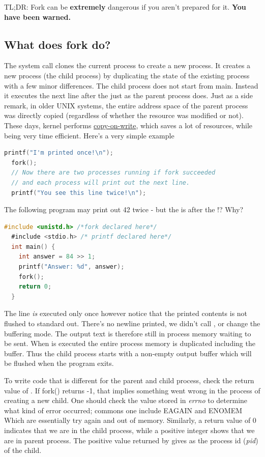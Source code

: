 TL;DR: Fork can be \textbf{extremely} dangerous if you aren't prepared for it. \textbf{You have been warned.}

\subsection{What does fork do?}

The  system call clones the current process to create a new process.
It creates a new process (the child process) by duplicating the state of the existing process with a few minor differences.
The child process does not start from main.
Instead it executes the next line after the  just as the parent process does.
Just as a side remark, in older UNIX systems, the entire address space of the parent process was directly copied (regardless of whether the resource was modified or not).
These days, kernel performs \href{https://en.wikipedia.org/wiki/Copy-on-write}{copy-on-write}, which saves a lot of resources, while being very time efficient.
Here's a very simple example

\begin{lstlisting}[language=C]
  printf("I'm printed once!\n");
  fork();
  // Now there are two processes running if fork succeeded
  // and each process will print out the next line.
  printf("You see this line twice!\n");
\end{lstlisting}

The following program may print out 42 twice - but the  is after the !? Why?

\begin{lstlisting}[language=C]
  #include <unistd.h> /*fork declared here*/
  #include <stdio.h> /* printf declared here*/
  int main() {
    int answer = 84 >> 1;
    printf("Answer: %d", answer);
    fork();
    return 0;
  }
\end{lstlisting}

The  line \emph{is} executed only once however notice that the printed contents is not flushed to standard out. There's no newline printed, we didn't call , or change the buffering mode. The output text is therefore still in process memory waiting to be sent. When  is executed the entire process memory is duplicated including the buffer. Thus the child process starts with a non-empty output buffer which will be flushed when the program exits.

To write code that is different for the parent and child process, check the return value of .
If fork() returns -1, that implies something went wrong in the process of creating a new child.
One should check the value stored in \emph{errno} to determine what kind of error occurred; commons one include EAGAIN and ENOMEM Which are essentially try again and out of memory.
Similarly, a return value of 0 indicates that we are in the child process, while a positive integer shows that we are in parent process.
The positive value returned by  gives as the process id (\emph{pid}) of the child.

